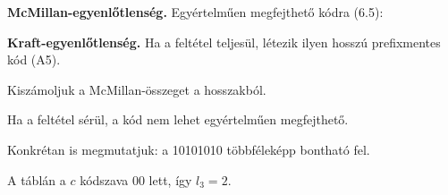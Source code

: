 \begin{elmelet}
\textbf{McMillan-egyenlőtlenség.} Egyértelműen megfejthető kódra (6.5):
\begin{center}\end{center}


\textbf{Kraft-egyenlőtlenség.} Ha a feltétel teljesül, létezik ilyen hosszú prefixmentes kód (A5).
\end{elmelet}

Kiszámoljuk a McMillan-összeget a hosszakból.

\begin{center}\end{center}

\begin{center}\end{center}

Ha a feltétel sérül, a kód nem lehet egyértelműen megfejthető.

\begin{center}\end{center}

Konkrétan is megmutatjuk: a 10101010 többféleképp bontható fel.

\begin{center}\end{center}

\begin{center}\end{center}

\begin{center}\end{center}

A táblán a $c$ kódszava $00$ lett, így $l_3=2$.

